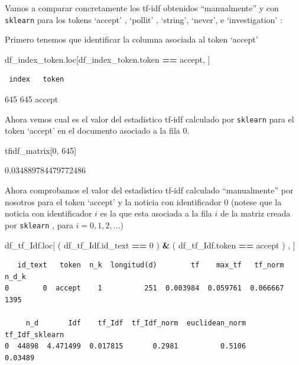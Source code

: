 \documentclass[
  11pt,
  a4paper,
]{article}
\newenvironment{Shaded}{\begin{snugshade}}{\end{snugshade}}
\newcommand{\DecValTok}[1]{\textcolor[rgb]{0.00,0.00,0.81}{#1}}
\newcommand{\NormalTok}[1]{#1}
\newcommand{\OperatorTok}[1]{\textcolor[rgb]{0.81,0.36,0.00}{\textbf{#1}}}
\newcommand{\StringTok}[1]{\textcolor[rgb]{0.31,0.60,0.02}{#1}}
\begin{document}
Vamos a comparar concretamente los tf-idf obtenidos ``manualmente'' y
con \texttt{sklearn} para los tokens `accept' , `pollit' , `string',
`never', e `investigation' :

Primero tenemos que identificar la columna asociada al token `accept'

\begin{Shaded}
\begin{Highlighting}[]
\NormalTok{df\_index\_token.loc[df\_index\_token.token }\OperatorTok{==} \StringTok{\textquotesingle{}accept\textquotesingle{}}\NormalTok{, ]}
\end{Highlighting}
\end{Shaded}

\begin{verbatim}
 index   token
\end{verbatim}

645 645 accept

Ahora vemos cual es el valor del estadistico tf-idf calculado por
\texttt{sklearn} para el token `accept' en el documento asociado a la
fila 0.

\begin{Shaded}
\begin{Highlighting}[]
\NormalTok{tfidf\_matrix[}\DecValTok{0}\NormalTok{, }\DecValTok{645}\NormalTok{]}
\end{Highlighting}
\end{Shaded}

0.034889784479772486

Ahora comprobamos el valor del estadistico tf-idf calculado
``manualmente'' por nosotros para el token `accept' y la noticia con
identificador 0 (notese que la noticia con identificador \(i\) es la que
esta asociada a la fila \(i\) de la matriz creada por \texttt{sklearn} ,
para \(i =0,1,2,...\))

\begin{Shaded}
\begin{Highlighting}[]
\NormalTok{df\_tf\_Idf.loc[ ( df\_tf\_Idf.id\_text }\OperatorTok{==} \DecValTok{0}\NormalTok{ ) }\OperatorTok{\&}\NormalTok{  ( df\_tf\_Idf.token }\OperatorTok{==} \StringTok{\textquotesingle{}accept\textquotesingle{}}\NormalTok{ ) , ]}
\end{Highlighting}
\end{Shaded}

\begin{verbatim}
   id_text   token  n_k  longitud(d)        tf    max_tf   tf_norm  n_d_k  
0        0  accept    1          251  0.003984  0.059761  0.066667   1395   

     n_d       Idf    tf_Idf  tf_Idf_norm  euclidean_norm  tf_Idf_sklearn  
0  44898  4.471499  0.017815       0.2981          0.5106         0.03489 
\end{verbatim}
\end{document}
